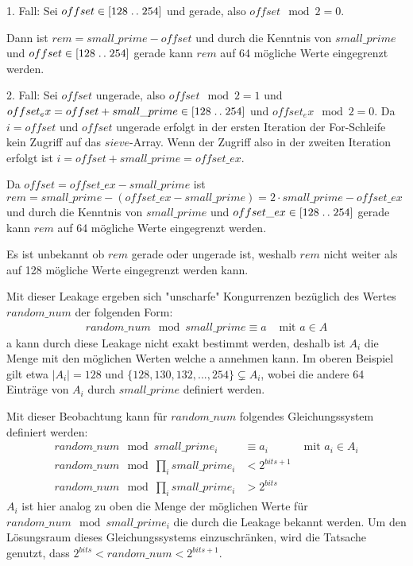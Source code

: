 1. Fall: Sei $offset \in [128\mathrel{{.}\,{.}}\nobreak254]$ und gerade, also $offset \mod 2 = 0$. 

Dann ist $rem = small\_prime - offset$ und durch die Kenntnis von $small\_prime$ und $offset \in [128\mathrel{{.}\,{.}}\nobreak254]$ gerade kann $rem$ auf 64 mögliche Werte eingegrenzt werden.

2. Fall: Sei $offset$ ungerade, also $offset \mod 2 = 1$ und $offset_ex = offset + small\_prime \in [128\mathrel{{.}\,{.}}\nobreak254]$ und $offset_ex \mod 2 = 0$. Da $i=offset$ und $offset$ ungerade erfolgt in der ersten Iteration der For-Schleife kein Zugriff auf das $sieve$-Array. Wenn der Zugriff also in der zweiten Iteration erfolgt ist $i = offset + small\_prime = offset\_ex$.

Da $offset = offset\_ex - small\_prime$ ist $rem = small\_prime - (offset\_ex - small\_prime) = 2 \cdot small\_prime - offset\_ex$ und durch die Kenntnis von $small\_prime$ und $offset\_ex \in [128\mathrel{{.}\,{.}}\nobreak254]$ gerade kann $rem$ auf 64 mögliche Werte eingegrenzt werden.

Es ist unbekannt ob $rem$ gerade oder ungerade ist, weshalb $rem$ nicht weiter als auf 128 mögliche Werte eingegrenzt werden kann.

Mit dieser Leakage ergeben sich "unscharfe" Kongurrenzen bezüglich des Wertes $random\_num$ der folgenden Form:
\begin{align}
    random\_num \mod small\_prime \equiv a &\text{ mit } a \in A
\end{align}
a kann durch diese Leakage nicht exakt bestimmt werden, deshalb ist $A_i$ die Menge mit den möglichen Werten welche a annehmen kann.
Im oberen Beispiel gilt etwa $|A_i| = 128$ und $\{128,130,132,...,254\} \subsetneq A_i$, wobei die andere 64 Einträge von $A_i$ durch $small\_prime$ definiert werden.

Mit dieser Beobachtung kann für $random\_num$ folgendes Gleichungssystem definiert werden:
\begin{align*}
    random\_num \mod small\_prime_i &\equiv a_i &\text{ mit } a_i \in A_i\\
    random\_num \mod \prod_i small\_prime_i &< 2^{bits+1} \\
    random\_num \mod \prod_i small\_prime_i &> 2^{bits}
\end{align*}
$A_i$ ist hier analog zu oben die Menge der möglichen Werte für $random\_num \mod small\_prime_i$ die durch die Leakage bekannt werden.
Um den Lösungsraum dieses Gleichungssystems einzuschränken, wird die Tatsache genutzt, dass $2^{bits} < random\_num < 2^{bits+1}$.

